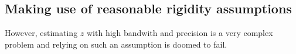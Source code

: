 \documentclass[12pt,a4paper,twoside]{article}
\begin{document}
\newpage


\subsection{Making use of reasonable rigidity assumptions}

 However, estimating $z$ with high bandwith and precision is a very complex problem and relying on such an assumption is doomed to fail. 

\end{document}
